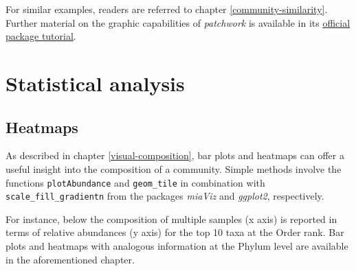\documentclass[
]{book}
\begin{document}
For similar examples, readers are referred to chapter \ref{community-similarity}.
Further material on the graphic capabilities of \emph{patchwork} is available in its
\href{https://patchwork.data-imaginist.com/articles/patchwork.html}{official package tutorial}.

\hypertarget{statistical-analysis}{%
\section{Statistical analysis}\label{statistical-analysis}}

\hypertarget{heatmaps}{%
\subsection{Heatmaps}\label{heatmaps}}

As described in chapter \ref{visual-composition}, bar plots and heatmaps can
offer a useful insight into the composition of a community. Simple methods involve
the functions \texttt{plotAbundance} and \texttt{geom\_tile} in combination with \texttt{scale\_fill\_gradientn}
from the packages \emph{miaViz} and \emph{ggplot2}, respectively.

For instance, below the composition of multiple samples (x axis) is reported
in terms of relative abundances (y axis) for the top 10 taxa at the Order rank.
Bar plots and heatmaps with analogous information at the Phylum level are
available in the aforementioned chapter.
\end{document}
